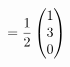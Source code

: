 \documentclass[preview]{standalone}
\begin{document}
\begin{align*}
= {1 \over 2} \begin{pmatrix} 1 \\ 3 \\ 0 \end{pmatrix}
\end{align*}
\end{document}
